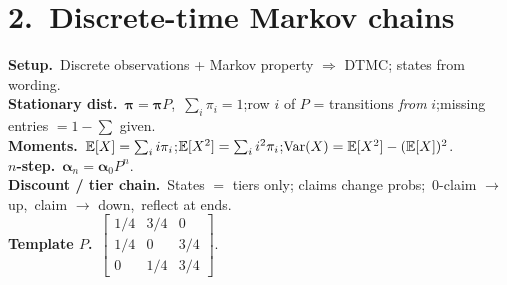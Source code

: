 \section*{2.\ Discrete-time Markov chains}
\textbf{Setup.}\ Discrete observations + Markov property $\Rightarrow$ DTMC; states from wording.\\
\textbf{Stationary dist.}\ $\boldsymbol{\pi}=\boldsymbol{\pi}P$,\ $\sum_i\pi_i=1$;\quad row $i$ of $P$ = transitions \emph{from} $i$;\quad missing entries $=1-\sum$ given.\\
\textbf{Moments.}\ $\mathbb{E}[X]=\sum_i i\pi_i$;\quad $\mathbb{E}[X^2]=\sum_i i^2\pi_i$;\quad $\mathrm{Var}(X)=\mathbb{E}[X^2]-(\mathbb{E}[X])^2$.\\
\textbf{$n$-step.}\ $\boldsymbol{\alpha}_n=\boldsymbol{\alpha}_0 P^n$.\\
\textbf{Discount / tier chain.}\ States $=$ tiers only; claims change probs;\ 0-claim $\to$ up,\ claim $\to$ down,\ reflect at ends.\\
\textbf{Template $P$.}\ $\begin{bmatrix}1/4&3/4&0\\[1pt]1/4&0&3/4\\[1pt]0&1/4&3/4\end{bmatrix}$.
